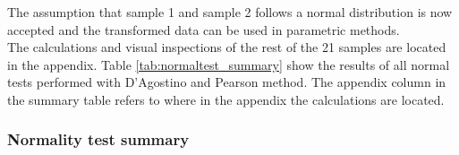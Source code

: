 The assumption that sample 1 and sample 2 follows a normal distribution is now accepted and the transformed data can be used in parametric methods. \\[0.5cm]

The calculations and visual inspections of the rest of the 21 samples are located in the appendix. Table \ref{tab:normaltest_summary} show the results of all normal tests performed with D'Agostino and Pearson method. The appendix column in the summary table refers to where in the appendix the calculations are located. 

\newpage

\subsubsection{Normality test summary}\label{sec:normaltest_summary}

